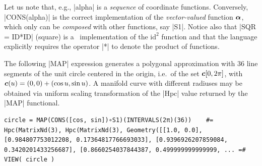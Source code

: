 \begin{coding}[Algebraic computation of FE = $\delta_1$]
{%

%


\begin{remark}
Let us note that, e.g., |alpha| is a \emph{sequence} of
coordinate functions.  Conversely, |CONS(alpha)| is the correct
implementation of the \emph{vector-valued} function ${\mbox{\boldmath $\alpha$}}$,
which only can be \emph{composed} with other functions, say
|S1|.
Notice also that |SQR = ID*ID| (square) is a \pl\ implementation of the
$\mbox{id}^{2}$ function and that the language explicitly requires the
operator |*| to denote the product of functions.
\end{remark}


\begin{condition}[Circle]
The following |MAP| expression generates a pol\-y\-gonal approximation with 36 line segments  of the unit circle centered in the origin, i.e.~of the set  ${\mbox{\boldmath $c$}}[0,2\pi]$, with ${\mbox{\boldmath $c$}}(u) = (0, 0) + (\cos u, \sin u)$. A manifold curve with different radiuses may be obtained via uniform scaling transformation of the |Hpc| value returned by the |MAP| functional.
\begin{lstlisting}[language=JuliaLocal, style=julia, mathescape=true]
circle = MAP(CONS([cos, sin])∘S1)(INTERVALS(2π)(36))	#=
Hpc(MatrixNd(3), Hpc(MatrixNd(3), Geometry([[1.0, 0.0], [0.984807753012208, 0.17364817766693033], [0.9396926207859084, 0.3420201433256687], [0.8660254037844387, 0.499999999999999, ... =#
VIEW( circle )
\end{lstlisting}
\end{condition}




}
\end{coding}
